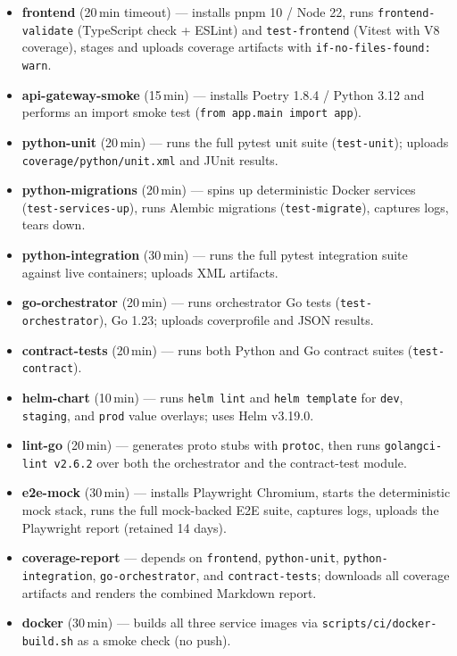 \documentclass[12pt,a4paper]{article}
\begin{document}
\begin{sloppypar}
\begin{itemize}[leftmargin=1.5em]
  \item \textbf{frontend} (20\,min timeout) --- installs pnpm 10 / Node 22,
        runs \texttt{frontend-validate} (TypeScript check + ESLint) and
        \texttt{test-frontend} (Vitest with V8 coverage), stages and uploads
        coverage artifacts with \texttt{if-no-files-found: warn}.
  \item \textbf{api-gateway-smoke} (15\,min) --- installs Poetry 1.8.4 /
        Python 3.12 and performs an import smoke test
        (\texttt{from app.main import app}).
  \item \textbf{python-unit} (20\,min) --- runs the full pytest unit suite
        (\texttt{test-unit}); uploads \texttt{coverage/python/unit.xml} and
        JUnit results.
  \item \textbf{python-migrations} (20\,min) --- spins up deterministic
        Docker services (\texttt{test-services-up}), runs Alembic migrations
        (\texttt{test-migrate}), captures logs, tears down.
  \item \textbf{python-integration} (30\,min) --- runs the full pytest
        integration suite against live containers; uploads XML artifacts.
  \item \textbf{go-orchestrator} (20\,min) --- runs orchestrator Go tests
        (\texttt{test-orchestrator}), Go 1.23; uploads coverprofile and JSON
        results.
  \item \textbf{contract-tests} (20\,min) --- runs both Python and Go
        contract suites (\texttt{test-contract}).
  \item \textbf{helm-chart} (10\,min) --- runs \texttt{helm lint} and
        \texttt{helm template} for \texttt{dev}, \texttt{staging}, and
        \texttt{prod} value overlays; uses Helm v3.19.0.
  \item \textbf{lint-go} (20\,min) --- generates proto stubs with
        \texttt{protoc}, then runs \texttt{golangci-lint v2.6.2} over both
        the orchestrator and the contract-test module.
  \item \textbf{e2e-mock} (30\,min) --- installs Playwright Chromium, starts
        the deterministic mock stack, runs the full mock-backed E2E suite,
        captures logs, uploads the Playwright report (retained 14 days).
  \item \textbf{coverage-report} --- depends on \texttt{frontend},
        \texttt{python-unit}, \texttt{python-integration},
        \texttt{go-orchestrator}, and \texttt{contract-tests}; downloads all
        coverage artifacts and renders the combined Markdown report.
  \item \textbf{docker} (30\,min) --- builds all three service images via
        \texttt{scripts/ci/docker-build.sh} as a smoke check (no push).
\end{itemize}
\end{sloppypar}
\end{document}
